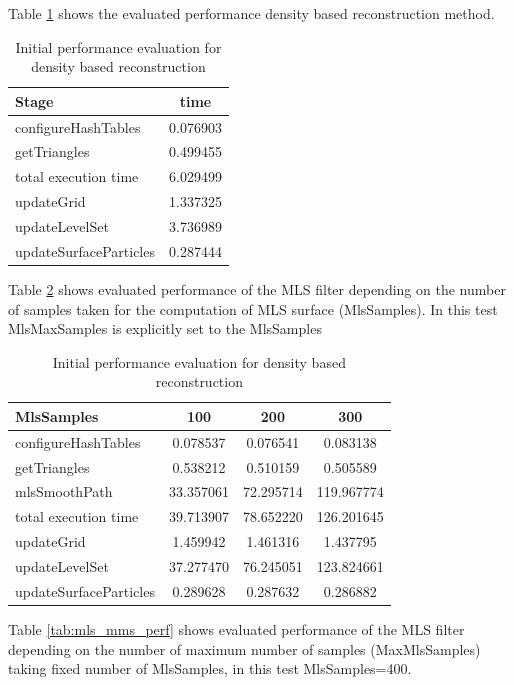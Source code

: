 Table \ref{tab:mls_initial_method} shows the evaluated performance density based reconstruction method.
\begin{table}[H]
	\begin{center}
		\scriptsize
		\begin{tabular}{|l|c|}
			\hline
			Stage & time \\
			\hline
				configureHashTables	&	0.076903\\
				getTriangles	&	0.499455\\
				total execution time	&	6.029499\\
				updateGrid	&	1.337325\\
				updateLevelSet	&	3.736989\\
				updateSurfaceParticles	&	0.287444\\
			\hline
		\end{tabular}
	\end{center}
	\caption{Initial performance evaluation for density based reconstruction}
	\label{tab:mls_initial_method}
\end{table}
Table \ref{tab:mls_ms_perf} shows evaluated performance of the MLS filter depending on the number of samples taken for the computation of MLS surface (MlsSamples). In this test MlsMaxSamples is explicitly set to the MlsSamples
\begin{table}[H]
	\begin{center}
		\scriptsize
		\begin{tabular}{|l|c|c|c|}
			\hline
			MlsSamples & 100 & 200 & 300 \\
			\hline
			configureHashTables		&	0.078537	&	0.076541	&	0.083138\\
			getTriangles			&	0.538212	&	0.510159	&	0.505589\\
			mlsSmoothPath			&	33.357061	&	72.295714	&	119.967774\\
			total execution time	&	39.713907	&	78.652220	&	126.201645\\
			updateGrid				&	1.459942	&	1.461316	&	1.437795\\
			updateLevelSet			&	37.277470	&	76.245051	&	123.824661\\
			updateSurfaceParticles	&	0.289628	&	0.287632	&	0.286882\\
			\hline
		\end{tabular}
	\end{center}
	\caption{Initial performance evaluation for density based reconstruction}
	\label{tab:mls_ms_perf}
\end{table}
Table \ref{tab:mls_mms_perf} shows evaluated performance of the MLS filter depending on the number of maximum number of samples  (MaxMlsSamples) taking fixed number of MlsSamples, in this test MlsSamples=400.
